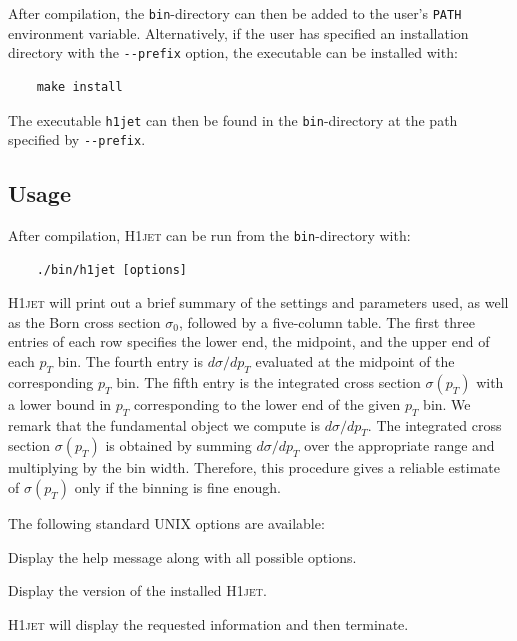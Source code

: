 \documentclass[12pt]{article}
\begin{document}
After compilation, the \texttt{bin}-directory can then be added to the
user's \texttt{PATH} environment variable. Alternatively, if the user
has specified an installation directory with the \texttt{-{}-prefix}
option, the executable can be installed with:
\begin{lstlisting}
	make install  
\end{lstlisting}
The executable \texttt{h1jet} can then be found in the \texttt{bin}-directory at the path specified by \texttt{-{}-prefix}. 

\subsection{Usage} 
After compilation, \textsc{H1jet} can be run from the \texttt{bin}-directory with: 
\begin{lstlisting}
	./bin/h1jet [options]  
\end{lstlisting}
\textsc{H1jet} will print out a brief summary of the settings
and parameters used, as well as the Born cross section
$\sigma_0$, followed by a five-column table. The first three entries of each row specifies the lower end, the midpoint, and the upper end of each $p_T$ bin. The fourth entry is $d\sigma/dp_T$ evaluated at the midpoint of the corresponding $p_T$ bin. The fifth entry is the integrated cross section $\sigma(p_T)$ with a lower bound in $p_T$ corresponding to the lower end of the given $p_T$ bin. We remark that the fundamental object we compute is $d\sigma/dp_T$. The integrated cross section $\sigma(p_T)$ is obtained by summing $d\sigma/dp_T$ over the appropriate range and multiplying by the bin width. Therefore, this procedure gives a reliable estimate of $\sigma(p_T)$ only if the binning is fine enough.

      \noindent      
The following standard UNIX options are available: 
\begin{description}[labelindent=1cm, labelwidth =\widthof{\bfseries9999999999999999999999}, leftmargin = !] 
	\item[\texttt{-h, -{}-help}] Display the help message along with all possible options. 
	\item[\texttt{-v, -{}-version}] Display the version of the installed \textsc{H1jet}. 
\end{description}
\textsc{H1jet} will display the requested information and then terminate. 
\end{document}
